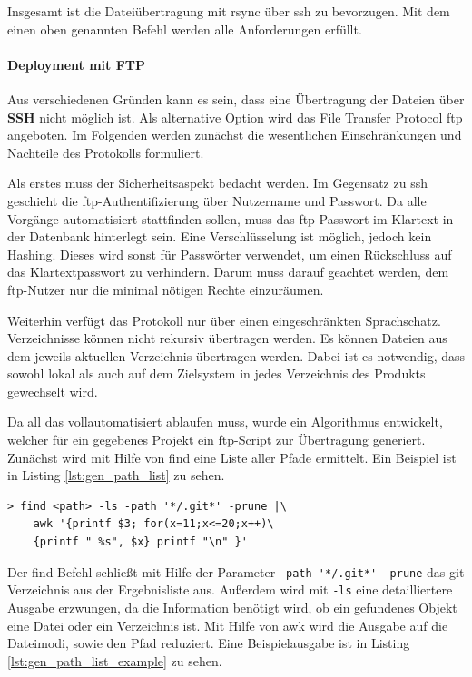 Insgesamt ist die Dateiübertragung mit rsync über \gls{ssh} zu bevorzugen. Mit dem einen oben genannten Befehl werden alle Anforderungen erfüllt.


\paragraph{Deployment mit FTP} %
\label{par:deployment_mit_ftp}

Aus verschiedenen Gründen kann es sein, dass eine Übertragung der Dateien über \textbf{SSH} nicht möglich ist. Als alternative Option wird das File Transfer Protocol \gls{ftp} angeboten. Im Folgenden werden zunächst die wesentlichen Einschränkungen und Nachteile des Protokolls formuliert.

Als erstes muss der Sicherheitsaspekt bedacht werden. Im Gegensatz zu \gls{ssh} geschieht die \gls{ftp}-Authentifizierung über Nutzername und Passwort. Da alle Vorgänge automatisiert stattfinden sollen, muss das \gls{ftp}-Passwort im Klartext in der Datenbank hinterlegt sein. Eine Verschlüsselung ist möglich, jedoch kein Hashing. Dieses wird sonst für Passwörter verwendet, um einen Rückschluss auf das Klartextpasswort zu verhindern. Darum muss darauf geachtet werden, dem \gls{ftp}-Nutzer nur die minimal nötigen Rechte einzuräumen.

Weiterhin verfügt das Protokoll nur über einen eingeschränkten Sprachschatz. Verzeichnisse können nicht rekursiv übertragen werden. Es können Dateien aus dem jeweils aktuellen Verzeichnis übertragen werden. Dabei ist es notwendig, dass sowohl lokal als auch auf dem Zielsystem in jedes Verzeichnis des Produkts gewechselt wird.

Da all das vollautomatisiert ablaufen muss, wurde ein Algorithmus entwickelt, welcher für ein gegebenes Projekt ein \gls{ftp}-Script zur Übertragung generiert. Zunächst wird mit Hilfe von find eine Liste aller Pfade ermittelt. Ein Beispiel ist in Listing \ref{lst:gen_path_list} zu sehen.

\begin{lstlisting}[caption=Generiere Liste aller Pfade,label={lst:gen_path_list}]
> find <path> -ls -path '*/.git*' -prune |\
	awk '{printf $3; for(x=11;x<=20;x++)\
	{printf " %s", $x} printf "\n" }'
\end{lstlisting}

Der \gls{find} Befehl schließt mit Hilfe der Parameter \lstinline!-path '*/.git*' -prune! das git Verzeichnis aus der Ergebnisliste aus. Außerdem wird mit \lstinline!-ls! eine detailliertere Ausgabe erzwungen, da die Information benötigt wird, ob ein gefundenes Objekt eine Datei oder ein Verzeichnis ist. Mit Hilfe von \gls{awk} wird die Ausgabe auf die Dateimodi, sowie den Pfad reduziert. Eine Beispielausgabe ist in Listing \ref{lst:gen_path_list_example} zu sehen.

